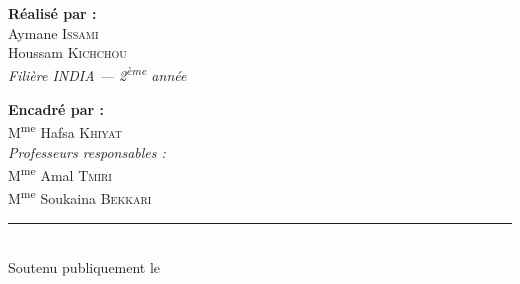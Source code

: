 \begin{titlepage}
    \begin{minipage}{0.45\textwidth}
        \centering
        {\large\textbf{Réalisé par :}}\\[0.4cm]
        {\large Aymane \textsc{Issami}}\\[0.15cm]
        {\large Houssam \textsc{Kichchou}}\\[0.3cm]
        {\small\itshape Filière INDIA --- 2\textsuperscript{ème} année}
    \end{minipage}\hfill
    \begin{minipage}{0.45\textwidth}
        \centering
        {\large\textbf{Encadré par :}}\\[0.4cm]
        {\large M\textsuperscript{me} Hafsa \textsc{Khiyat}}\\[0.4cm]
        {\normalsize\textit{Professeurs responsables :}}\\[0.1cm]
        {\normalsize M\textsuperscript{me} Amal \textsc{Tmiri}}\\[0.1cm]
        {\normalsize M\textsuperscript{me} Soukaina \textsc{Bekkari}}
    \end{minipage}

    \vfill

    \rule{0.5\textwidth}{0.4pt}\\[0.3cm]
    {\small Soutenu publiquement le \underline{\hspace{3.5cm}}}

\end{titlepage}
